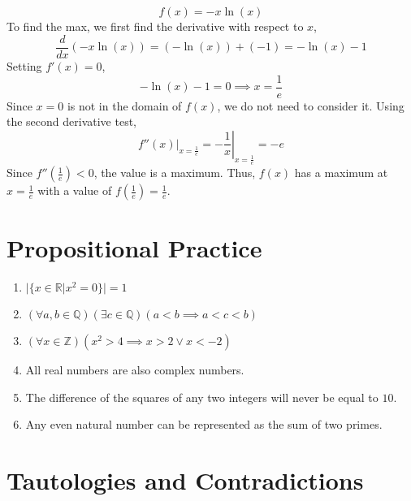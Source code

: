 \documentclass{article}
\newcommand{\Z}{\mathbb{Z}}
\newcommand{\Q}{\mathbb{Q}}
\newcommand{\R}{\mathbb{R}}
\newcommand{\diff}[1]{\frac{d}{d #1}}
\begin{document}
\subsection{}

\begin{equation}
    f(x) = -x \ln(x)
\end{equation}
To find the max, we first find the derivative with respect to \(x\),
\begin{equation}
    \diff{x} (-x \ln(x)) = (-\ln(x)) + (-1) = -\ln(x) - 1
\end{equation}
Setting \(f'(x) = 0\),
\begin{equation}
    -\ln(x) - 1 = 0 \implies x = \frac{1}{e}
\end{equation}
Since \(x = 0\) is not in the domain of \(f(x)\), we do not need to consider it.
Using the second derivative test,
\begin{equation}
    f''(x)|_{x = \frac{1}{e}} = \left.-\frac{1}{x}\right|_{x = \frac{1}{e}} = -e
\end{equation}
Since \(f''\left(\frac{1}{e}\right) < 0\), the value is a maximum.
Thus, \(f(x)\) has a maximum at \(x = \frac{1}{e}\) with a value of \(f\left(\frac{1}{e}\right) = \frac{1}{e}\).

\section{Propositional Practice}

\begin{enumerate}
    \item \(|\{x \in \R | x^2 = 0\}| = 1\)
    \item \((\forall a, b \in \Q)(\exists c \in \Q)(a < b \implies a < c < b)\)
    \item \((\forall x \in \Z)(x^2 > 4 \implies x > 2 \lor x < -2)\)
    \item All real numbers are also complex numbers.
    \item The difference of the squares of any two integers will never be equal to \(10\).
    \item Any even natural number can be represented as the sum of two primes.
\end{enumerate}

\section{Tautologies and Contradictions}

\subsection{}
\end{document}
